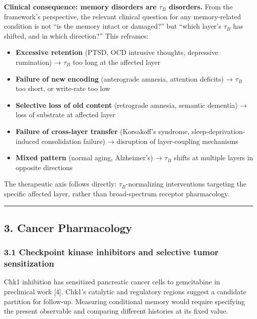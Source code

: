 \documentclass[
]{article}
\providecommand{\tightlist}{%
  \setlength{\itemsep}{0pt}\setlength{\parskip}{0pt}}
\begin{document}
\textbf{Clinical consequence: memory disorders are \(\tau_B\)
disorders.} From the framework's perspective, the relevant clinical
question for any memory-related condition is not ``is the memory intact
or damaged?'' but ``which layer's \(\tau_B\) has shifted, and in which
direction?'' This reframes:

\begin{itemize}
\tightlist
\item
  \textbf{Excessive retention} (PTSD, OCD intrusive thoughts, depressive
  rumination) → \(\tau_B\) too long at the affected layer
\item
  \textbf{Failure of new encoding} (anterograde amnesia, attention
  deficits) → \(\tau_B\) too short, or write-rate too low
\item
  \textbf{Selective loss of old content} (retrograde amnesia, semantic
  dementia) → loss of substrate at affected layer
\item
  \textbf{Failure of cross-layer transfer} (Korsakoff's syndrome,
  sleep-deprivation-induced consolidation failure) → disruption of
  layer-coupling mechanisms
\item
  \textbf{Mixed pattern} (normal aging, Alzheimer's) → \(\tau_B\) shifts
  at multiple layers in opposite directions
\end{itemize}

The therapeutic axis follows directly: \(\tau_B\)-normalizing
interventions targeting the specific affected layer, rather than
broad-spectrum receptor pharmacology.

\begin{center}\rule{0.5\linewidth}{0.5pt}\end{center}

\hypertarget{cancer-pharmacology}{%
\subsection{3. Cancer Pharmacology}\label{cancer-pharmacology}}

\hypertarget{checkpoint-kinase-inhibitors-and-selective-tumor-sensitization}{%
\subsubsection{3.1 Checkpoint kinase inhibitors and selective tumor
sensitization}\label{checkpoint-kinase-inhibitors-and-selective-tumor-sensitization}}

Chk1 inhibition has sensitized pancreatic cancer cells to gemcitabine in
preclinical work {[}4{]}. Chk1's catalytic and regulatory regions
suggest a candidate partition for follow-up. Measuring conditional
memory would require specifying the present observable and comparing
different histories at its fixed value.
\end{document}
